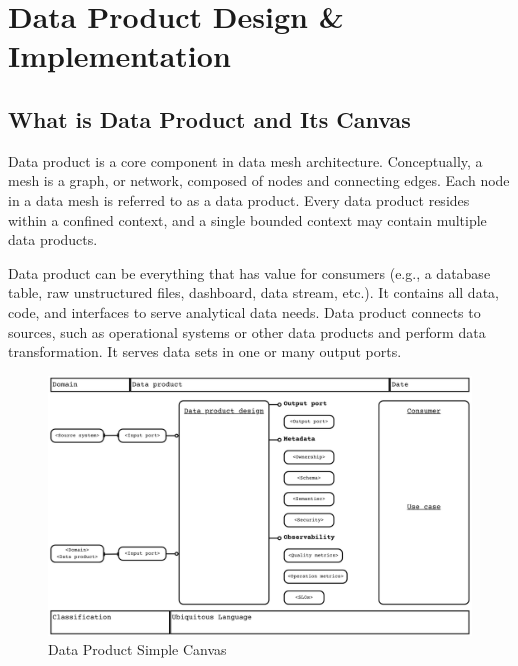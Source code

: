 \documentclass[12pt, a4paper]{book}
\begin{document}
\let\cleardoublepage\clearpage
\chapter{Data Product Design \& Implementation}
\section{What is Data Product and Its Canvas}
Data product is a core component in data mesh architecture. Conceptually, a mesh is a graph, or network, composed of nodes and connecting edges. Each node in a data mesh is referred to as a data product. Every data product resides within a confined context, and a single bounded context may contain multiple data products.

Data product can be everything that has value for consumers (e.g., a database table, raw unstructured files, dashboard, data stream, etc.). It contains all data, code, and interfaces to serve analytical data needs. Data product connects to sources, such as operational systems or other data products and perform data transformation. It serves data sets in one or many output ports. \cite{datameshweb}

\begin{figure}[ht]
	\vspace*{-.3cm}
	\begin{framed}
		\centering
		\includegraphics[width=15cm]{DPCanvas.png}
		\caption{Data Product Simple Canvas}
		\label{DPCanvas}
	\end{framed}
\end{figure}
\end{document}
